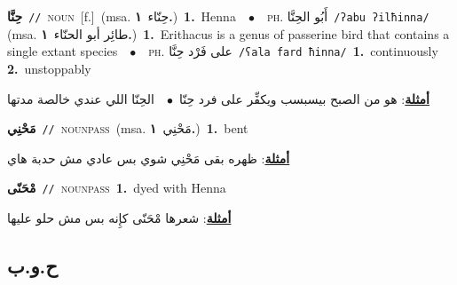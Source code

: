 \documentclass[10pt,a4paper,twoside]{article} %
\begin{document}
\begin{multicols}{2}
{\setlength\topsep{0pt}\textbf{\foreignlanguage{arabic}{حِنَّا}}\ {\color{gray}\texttt{//}\color{black}}\ \textsc{noun}\ [f.]\ \color{gray}(msa. \foreignlanguage{arabic}{حِنّاء}~\foreignlanguage{arabic}{\textbf{١.}})\color{black}\ \textbf{1.}~Henna\ \ $\bullet$\ \ \textsc{ph.} \color{gray} \foreignlanguage{arabic}{أَبُو الحِنَّا}\color{black}\ {\color{gray}\texttt{/{\sffamily ʔabu ʔilħinna}/}\color{black}}\ \color{gray} (msa. \foreignlanguage{arabic}{طائِر أبو الحنّاء}~\foreignlanguage{arabic}{\textbf{١.}})\color{black}\ \textbf{1.}~Erithacus is a genus of passerine bird that contains a single extant species\ \ $\bullet$\ \ \textsc{ph.} \color{gray} \foreignlanguage{arabic}{على فَرْد حِنَّا}\color{black}\ {\color{gray}\texttt{/{\sffamily ʕala fard ħinna}/}\color{black}}\ \textbf{1.}~continuously  \textbf{2.}~unstoppably\  \begin{flushright}\color{gray}\foreignlanguage{arabic}{\textbf{\underline{\foreignlanguage{arabic}{أمثلة}}}: هو من الصبح بيسبسب ويكفِّر على فرد حِنّا\ $\bullet$\ \  الحِنّا اللي عندي خالصة مدتها}\end{flushright}\color{black}} \vspace{2mm}

{\setlength\topsep{0pt}\textbf{\foreignlanguage{arabic}{مَحْنِي}}\ {\color{gray}\texttt{//}\color{black}}\ \textsc{noun\textunderscore pass}\ \color{gray}(msa. \foreignlanguage{arabic}{مَحْنِي}~\foreignlanguage{arabic}{\textbf{١.}})\color{black}\ \textbf{1.}~bent\  \begin{flushright}\color{gray}\foreignlanguage{arabic}{\textbf{\underline{\foreignlanguage{arabic}{أمثلة}}}: ظهره بقى مَحْنِي شوي بس عادي مش حدبة هاي}\end{flushright}\color{black}} \vspace{2mm}

{\setlength\topsep{0pt}\textbf{\foreignlanguage{arabic}{مْحَنّى}}\ {\color{gray}\texttt{//}\color{black}}\ \textsc{noun\textunderscore pass}\ \textbf{1.}~dyed with Henna\  \begin{flushright}\color{gray}\foreignlanguage{arabic}{\textbf{\underline{\foreignlanguage{arabic}{أمثلة}}}: شعرها مْحَنّى كإِنه بس مش حلو عليها}\end{flushright}\color{black}} \vspace{2mm}

\vspace{-3mm}
\subsection*{\color{blue}\foreignlanguage{arabic}{ح.و.ب}\color{blue}{}} 


\end{multicols}
\end{document}
